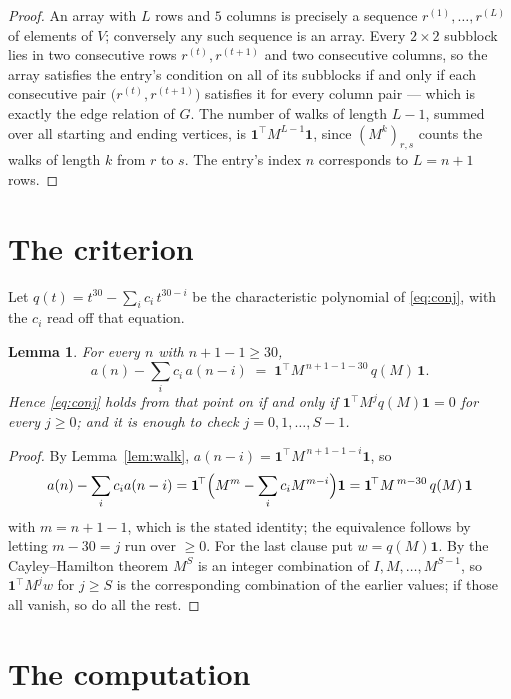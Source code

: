 \documentclass[11pt,a4paper]{article}
\theoremstyle{plain}
\newtheorem{lemma}[theorem]{Lemma}
\theoremstyle{definition}
\begin{document}
\begin{proof}
An array with $L$ rows and $5$ columns is precisely a sequence
$r^{(1)},\dots,r^{(L)}$ of elements of $V$; conversely any such sequence is an array.
Every $2\times2$ subblock lies in two consecutive rows $r^{(t)},r^{(t+1)}$ and two
consecutive columns, so the array satisfies the entry's condition on all of its subblocks
if and only if each consecutive pair $\bigl(r^{(t)},r^{(t+1)}\bigr)$ satisfies it for
every column pair --- which is exactly the edge relation of $G$. The number of walks of
length $L-1$, summed over all starting and ending vertices, is
$\mathbf{1}^{\!\top}M^{L-1}\mathbf{1}$, since $(M^{k})_{r,s}$ counts the walks of
length $k$ from $r$ to $s$. The entry's index $n$ corresponds to $L=n+1$ rows.
\end{proof}

\section{The criterion}

Let $q(t)=t^{30}-\sum_i c_i\,t^{30-i}$ be the characteristic polynomial of
\eqref{eq:conj}, with the $c_i$ read off that equation.

\begin{lemma}\label{lem:crit}
For every $n$ with $n+1-1\ge30$,
\[
a(n)-\sum_i c_i\,a(n-i)\;=\;\mathbf{1}^{\!\top}M^{\,n+1-1-30}\,q(M)\,\mathbf{1} .
\]
Hence \eqref{eq:conj} holds from that point on if and only if
$\mathbf{1}^{\!\top}M^{j}q(M)\mathbf{1}=0$ for every $j\ge0$; and it is enough to check
$j=0,1,\dots,S-1$.
\end{lemma}

\begin{proof}
By Lemma~\ref{lem:walk}, $a(n-i)=\mathbf{1}^{\!\top}M^{\,n+1-1-i}\mathbf{1}$, so
\[
a(n)-\sum_i c_i a(n-i)
=\mathbf{1}^{\!\top}\Bigl(M^{m}-\sum_i c_i M^{m-i}\Bigr)\mathbf{1}
=\mathbf{1}^{\!\top}M^{\,m-30}\,q(M)\,\mathbf{1}
\]
with $m=n+1-1$, which is the stated identity; the equivalence follows by letting
$m-30=j$ run over $\ge0$. For the last clause put $w=q(M)\mathbf{1}$. By the
Cayley--Hamilton theorem $M^{S}$ is an integer combination of $I,M,\dots,M^{S-1}$, so
$\mathbf{1}^{\!\top}M^{j}w$ for $j\ge S$ is the corresponding combination of the earlier
values; if those all vanish, so do all the rest.
\end{proof}

\section{The computation}
\end{document}

